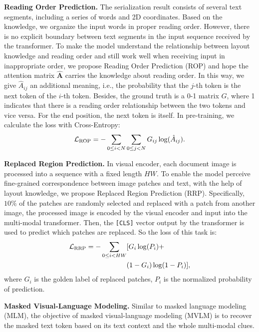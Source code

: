 \documentclass[11pt]{article}
\begin{document}
\noindent\textbf{Reading Order Prediction.}
The serialization result consists of several text segments, including a series of words and 2D coordinates. Based on the knowledge, we organize the input words in proper reading order. 
However, there is no explicit boundary between text segments in the input sequence received by the transformer. 
To make the model understand the relationship between layout knowledge and reading order and still work well when receiving input in inappropriate order, we propose Reading Order Prediction (ROP) and hope the attention matrix $\hat{\textbf{A}}$ carries the knowledge about reading order.
In this way, we give ${\hat{A}_{ij}}$ an additional meaning, i.e., the probability that the $j$-th token is the next token of the $i$-th token.
Besides, the ground truth is a 0-1 matrix $G$, where 1 indicates that there is a reading order relationship between the two tokens and vice versa. For the end position, the next token is itself.
In pre-training, we calculate the loss with Cross-Entropy:
\begin{equation}
    \mathcal{L}_{\rm ROP} = - \sum_{0 \leq i < N} \sum_{0 \leq j < N} G_{ij} \log(\hat{A}_{ij}).
\end{equation}

\noindent\textbf{Replaced Region Prediction.}
In visual encoder, each document image is processed into a sequence with a fixed length $HW$.
To enable the model perceive fine-grained correspondence between image patches and text, with the help of layout knowledge, we propose Replaced Region Prediction (RRP).
Specifically, $10\%$ of the patches are randomly selected and replaced with a patch from another image, the processed image is encoded by the visual encoder and input into the multi-modal transformer. 
Then, the \verb|[CLS]| vector output by the transformer is used to predict which patches are replaced. 
So the loss of this task is:
\begin{align}
    \mathcal{L}_{\rm RRP}= - \sum_{0 \leq i < HW} & [ G_i \log(P_i) + \nonumber \\ 
        & (1- G_i)\log(1- P_i)],
\end{align}
where $G_i$ is the golden label of replaced patches, $P_i$ is the normalized probability of prediction.

\noindent\textbf{Masked Visual-Language Modeling.}
Similar to masked language modeling (MLM), the objective of masked visual-language modeling (MVLM) is to recover the masked text token based on its text context and the whole multi-modal clues.
\end{document}
